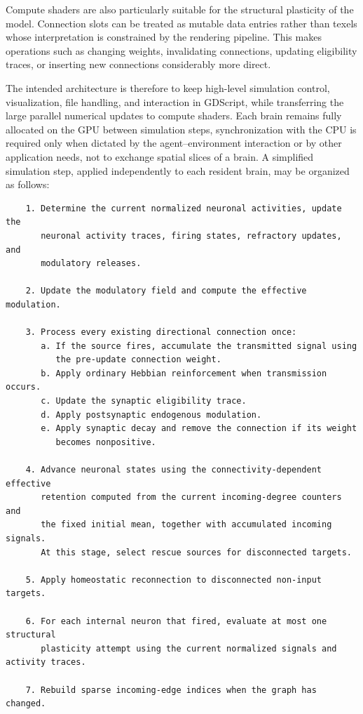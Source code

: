 \documentclass[12pt,a4paper]{article}
\begin{document}
	Compute shaders are also particularly suitable for the structural plasticity of the model. Connection slots can be treated as mutable data entries rather than texels whose interpretation is constrained by the rendering pipeline. This makes operations such as changing weights, invalidating connections, updating eligibility traces, or inserting new connections considerably more direct.

	The intended architecture is therefore to keep high-level simulation control, visualization, file handling, and interaction in GDScript, while transferring the large parallel numerical updates to compute shaders. Each brain remains fully allocated on the GPU between simulation steps, synchronization with the CPU is required only when dictated by the agent--environment interaction or by other application needs, not to exchange spatial slices of a brain. A simplified simulation step, applied independently to each resident brain, may be organized as follows:

	\begin{verbatim}
	1. Determine the current normalized neuronal activities, update the
	   neuronal activity traces, firing states, refractory updates, and
	   modulatory releases.

	2. Update the modulatory field and compute the effective modulation.

	3. Process every existing directional connection once:
	   a. If the source fires, accumulate the transmitted signal using
		  the pre-update connection weight.
	   b. Apply ordinary Hebbian reinforcement when transmission occurs.
	   c. Update the synaptic eligibility trace.
	   d. Apply postsynaptic endogenous modulation.
	   e. Apply synaptic decay and remove the connection if its weight
		  becomes nonpositive.

	4. Advance neuronal states using the connectivity-dependent effective
	   retention computed from the current incoming-degree counters and
	   the fixed initial mean, together with accumulated incoming signals.
	   At this stage, select rescue sources for disconnected targets.

	5. Apply homeostatic reconnection to disconnected non-input targets.

	6. For each internal neuron that fired, evaluate at most one structural
	   plasticity attempt using the current normalized signals and activity traces.

	7. Rebuild sparse incoming-edge indices when the graph has changed.
	\end{verbatim}
\end{document}
